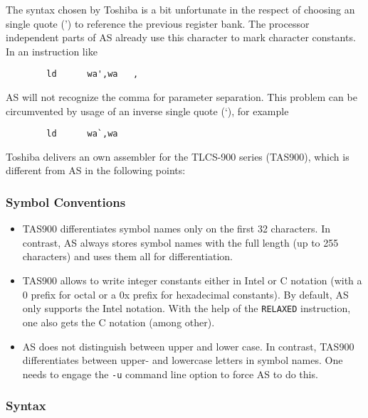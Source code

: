 \documentclass[12pt,twoside]{report}
\newcommand{\tty}[1]{{\tt #1}}
\begin{document}
The syntax chosen by Toshiba is a bit unfortunate in the respect of
choosing an single quote (') to reference the previous register bank.  The
processor independent parts of AS already use this character to mark
character constants.  In an instruction like
\begin{verbatim}
        ld      wa',wa   ,
\end{verbatim}
AS will not recognize the comma for parameter separation.  This
problem can be circumvented by usage of an inverse single quote (`), for
example
\begin{verbatim}
        ld      wa`,wa
\end{verbatim}
Toshiba delivers an own assembler for the TLCS-900 series (TAS900),
which is different from AS in the following points:

\subsubsection{Symbol Conventions}

\begin{itemize}
\item{TAS900 differentiates symbol names only on the first 32
      characters.  In contrast, AS always stores symbol names with the
      full length (up to 255 characters) and uses them all for
      differentiation.}
\item{TAS900 allows to write integer constants either in Intel or C
      notation (with a 0 prefix for octal or a 0x prefix for hexadecimal
      constants).  By default, AS only supports the Intel notation.
      With the help of the \tty{RELAXED} instruction, one also gets the C
      notation (among other).}
\item{AS does not distinguish between upper and lower case.  In
      contrast, TAS900 differentiates between upper- and lowercase
      letters in symbol names.  One needs to engage the \tty{-u} command
      line option to force AS to do this.}
\end{itemize}

\subsubsection{Syntax}
\end{document}
